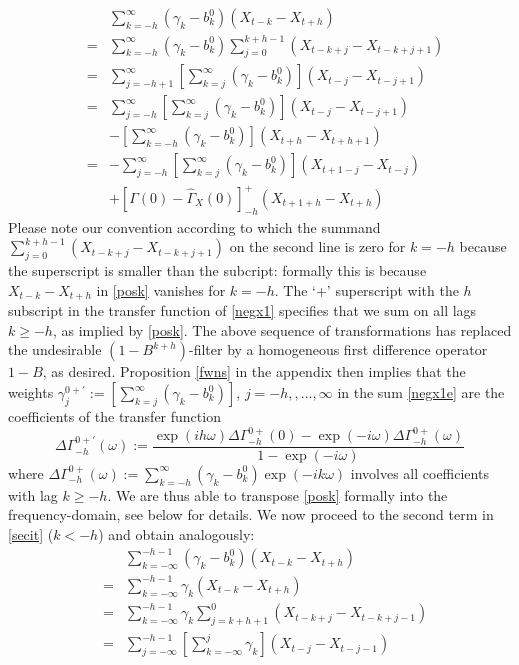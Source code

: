 \documentclass[11pt]{article}
\begin{document}
\begin{eqnarray}
&&\sum_{k=-h}^\infty({\gamma}_{k}-b_k^0)(X_{t-k}-X_{t+h})\label{posk}\\
&=&\sum_{k=-h}^\infty({\gamma}_{k}-b_k^0)\sum_{j=0}^{k+h-1}(X_{t-k+j}-X_{t-k+j+1})\nonumber\\
&=&\sum_{j=-h+1}^\infty
\left[\sum_{k=j}^\infty({\gamma}_{k}-b_k^0)\right]
(X_{t-j}-X_{t-j+1})\label{negx}\\
&=&\sum_{j=-h}^\infty
\left[\sum_{k=j}^\infty({\gamma}_{k}-b_k^0)\right]
(X_{t-j}-X_{t-j+1})\nonumber\\
&&-\left[\sum_{k=-h}^\infty({\gamma}_{k}-b_k^0)\right]
(X_{t+h}-X_{t+h+1})\nonumber\\
&=&-\sum_{j=-h}^\infty
\left[\sum_{k=j}^\infty({\gamma}_{k}-b_k^0)\right]
(X_{t+1-j}-X_{t-j})\label{negx1e}\\
&&+\left[\Gamma(0)-\hat{\Gamma}_X(0)\right]_{-h}^+
(X_{t+1+h}-X_{t+h})\label{negx1}
\end{eqnarray}
Please note our convention according to which the summand $\sum_{j=0}^{k+h-1}(X_{t-k+j}-X_{t-k+j+1})$ on the second line is zero for $k=-h$ because the superscript is smaller than the subcript: formally this is because $X_{t-k}-X_{t+h}$ in \ref{posk} vanishes for $k=-h$. The `+' superscript with the $h$ subscript in the transfer function of \ref{negx1} specifies that we sum on all lags $k\geq -h$, as implied by \ref{posk}. The above sequence of transformations has replaced the undesirable $(1-B^{k+h})$-filter by a homogeneous first difference operator $1-B$, as desired. 
Proposition \ref{fwns} in the appendix then implies that the weights
$\gamma_j^{0+'}:=\left[\sum_{k=j}^\infty({\gamma}_{k}-b_k^0)\right]$, $j=-h,,...,\infty$ in the sum \ref{negx1e} are
the coefficients of the transfer function
\begin{equation}\label{trans1}
\Delta\Gamma_{-h}^{0+'}(\omega):=\frac{\exp(ih\omega)\Delta\Gamma_{-h}^{0+}(0)-\exp(-i\omega)\Delta\Gamma_{-h}^{0+}(\omega)}{1-\exp(-i\omega)}
\end{equation}
where $\Delta \Gamma_{-h}^{0+}(\omega):=\sum_{k=-h}^\infty (\gamma_k-b_k^0)\exp(-ik\omega)$ involves all coefficients with lag $k\geq -h$.
We are thus able to transpose \ref{posk} formally into the frequency-domain, see below for details. We now proceed to the second term in \ref{secit}  ($k<-h$)  and obtain analogously:
\begin{eqnarray}
&&\sum_{k=-\infty}^{-h-1}(\gamma_{k}-b_k^0)(X_{t-k}-X_{t+h})\label{negk}\\
&=&\sum_{k=-\infty}^{-h-1}\gamma_{k}(X_{t-k}-X_{t+h})\label{negk}\\
&=&\sum_{k=-\infty}^{-h-1}\gamma_{k}\sum_{j=k+h+1}^{0}(X_{t-k+j}-X_{t-k+j-1})\nonumber\\
&=&\sum_{j=-\infty}^{-h-1}\left[\sum_{k=-\infty}^j\gamma_{k}\right](X_{t-j}-X_{t-j-1})\label{negk1}
\end{eqnarray}
\end{document}
